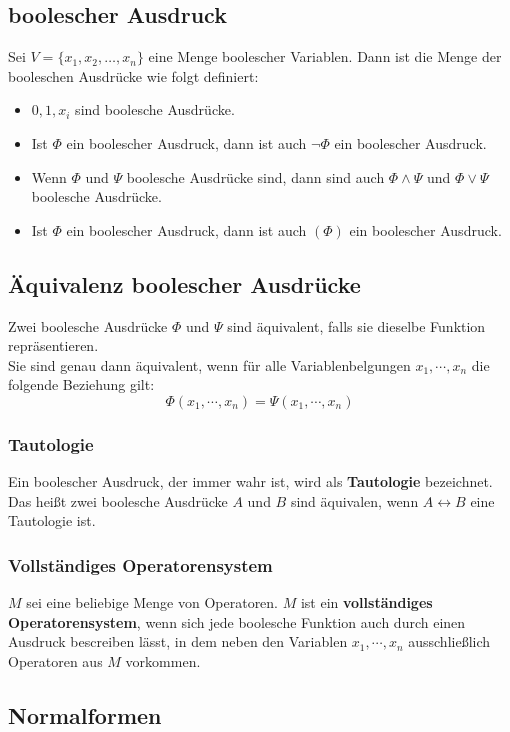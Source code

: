 \documentclass[12pt]{article}
\begin{document}
\subsection{boolescher Ausdruck}
Sei $V = \{x_1, x_2, \dots, x_n\}$ eine Menge boolescher Variablen. Dann ist die Menge der booleschen Ausdrücke wie folgt definiert: \\
\begin{itemize}
    \item $0,1,x_i$ sind boolesche Ausdrücke.
    \item Ist $\Phi$ ein boolescher Ausdruck, dann ist auch $\neg \Phi$ ein boolescher Ausdruck.
    \item Wenn $\Phi$ und $\Psi$ boolesche Ausdrücke sind, dann sind auch $\Phi \land \Psi$ und $\Phi \lor \Psi$ boolesche Ausdrücke.
    \item Ist $\Phi$ ein boolescher Ausdruck, dann ist auch $(\Phi)$ ein boolescher Ausdruck.
\end{itemize}
\subsection{Äquivalenz boolescher Ausdrücke}
Zwei boolesche Ausdrücke $\Phi$ und $\Psi$ sind äquivalent, falls sie dieselbe Funktion repräsentieren. \\ 
Sie sind genau dann äquivalent, wenn für alle Variablenbelgungen $x_1, \cdots, x_n$ die folgende Beziehung gilt:
\[\Phi(x_1,\cdots,x_n) = \Psi(x_1,\cdots,x_n)\]
\subsubsection{Tautologie}
Ein boolescher Ausdruck, der immer wahr ist, wird als \textbf{Tautologie} bezeichnet.\\
Das heißt zwei boolesche Ausdrücke $A$ und $B$ sind äquivalen, wenn $A \leftrightarrow B$ eine Tautologie ist.
\subsubsection{Vollständiges Operatorensystem}
$M$ sei eine beliebige Menge von Operatoren. $M$ ist ein \textbf{vollständiges Operatorensystem}, wenn sich jede boolesche Funktion auch durch einen Ausdruck bescreiben lässt, in dem neben den Variablen $x_1, \cdots, x_n$ ausschließlich Operatoren aus $M$ vorkommen.
\subsection{Normalformen}
\end{document}
